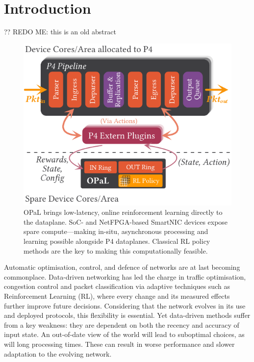 \documentclass[sigconf,natbib=false]{acmart}
\newcommand{\approachshort}{OPaL}
\begin{document}
\maketitle

\setlength{\aweboxleftmargin}{0.12\linewidth}
\setlength{\aweboxcontentwidth}{1.97\linewidth}
	
\section{Introduction}
?? REDO ME: this is an old abstract

\begin{figure}
	\centering
	\includegraphics[keepaspectratio, width=0.9\linewidth]{figures/arch-with-p4}
	\caption{\approachshort{} brings low-latency, online reinforcement learning directly to the dataplane. SoC- and NetFPGA-based SmartNIC devices expose spare compute---making in-situ, asynchronous processing and learning possible alongside P4 dataplanes. Classical RL policy methods are the key to making this computationally feasible.\label{fig:netro-arch}}
\end{figure}

Automatic optimisation, control, and defence of networks are at last becoming commonplace. Data-driven networking has led the charge in traffic optimisation, congestion control and packet classification via adaptive techniques such as Reinforcement Learning (RL), where every change and its measured effects further improve future decisions. Considering that the network evolves in its use and deployed protocols, this flexibility is essential. Yet data-driven methods suffer from a key weakness: they are dependent on both the recency and accuracy of input state. An out-of-date view of the world will lead to suboptimal choices, as will long processing times. These can result in worse performance and slower adaptation to the evolving network.
\end{document}
